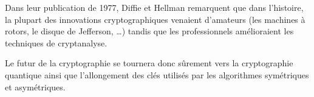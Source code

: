 Dans leur publication de 1977\cite{NewDirectionsInCryptography},
Diffie et Hellman remarquent que dans l'histoire, la plupart des
innovations cryptographiques venaient d'amateurs (les machines à
rotors, le disque de Jefferson, \dots) tandis que les professionnels
amélioraient les techniques de cryptanalyse.

Le futur de la cryptographie se tournera donc sûrement vers la
cryptographie quantique ainsi que l'allongement des clés utilisés par
les algorithmes symétriques et asymétriques.


